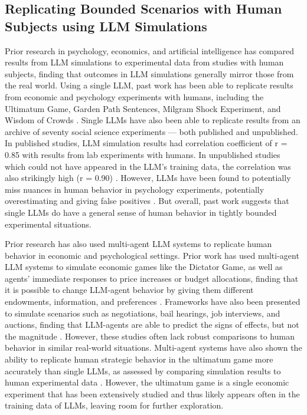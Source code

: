 \subsection{Replicating Bounded Scenarios with Human Subjects using LLM Simulations}

Prior research in psychology, economics, and artificial intelligence has compared results from LLM simulations to experimental data from studies with human subjects, finding that outcomes in LLM simulations generally mirror those from the real world. Using a single LLM, past work has been able to replicate results from economic and psychology experiments with humans, including the Ultimatum Game, Garden Path Sentences, Milgram Shock Experiment, and Wisdom of Crowds \cite{aher2023usinglargelanguagemodels}. Single LLMs have also been able to replicate results from an archive of seventy social science experiments — both published and unpublished. In published studies, LLM simulation results had correlation coefficient of r = 0.85 with results from lab experiments with humans. In unpublished studies which could not have appeared in the LLM's training data, the correlation was also strikingly high (r = 0.90) \cite{hewitt2024predicting}. However, LLMs have been found to potentially miss nuances in human behavior in psychology experiments, potentially overestimating and giving false positives \cite{cui2024aireplacehumansubjects}. But overall, past work suggests that single LLMs do have a general sense of human behavior in tightly bounded experimental situations. 

Prior research has also used multi-agent LLM systems to replicate human behavior in economic and psychological settings. Prior work has used multi-agent LLM systems to simulate economic games like the Dictator Game, as well as agents' immediate responses to price increases or budget allocations, finding that it is possible to change LLM-agent behavior by giving them different endowments, information, and preferences \cite{horton2023largelanguagemodelssimulated}. Frameworks have also been presented to simulate scenarios such as negotiations, bail hearings, job interviews, and auctions, finding that LLM-agents are able to predict the signs of effects, but not the magnitude \cite{manning2024automated}. However, these studies often lack robust comparisons to human behavior in similar real-world situations. Multi-agent systems have also shown the ability to replicate human strategic behavior in the ultimatum game more accurately than single LLMs, as assessed by comparing simulation results to human experimental data  \cite{sreedhar2024simulatinghumanstrategicbehavior}. However, the ultimatum game is a single economic experiment that has been extensively studied and thus likely appears often in the training data of LLMs, leaving room for further exploration.

